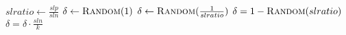 \begin{algorithm}[htbp]
\begin{multicols}{2}
\begin{algorithmic}[1]
		\State \Return{$ \delta $}
	\EndIf
	\\
	\State $ slratio \gets \frac{slp}{sln} $
		\State $ \delta \gets \Call{Random}{1} $
		\State $ \delta \gets \Call{Random}{\frac{1}{slratio}} $
	\Else
		\State $ \delta = 1 - \Call{Random}{slratio} $
	\EndIf
	\\
		\State $ \delta = \delta \cdot \frac{sln}{k} $
	\EndIf
	\\
	\State \Return{$ \delta $}
\EndFunction
\end{algorithmic}
\end{multicols}
\end{algorithm}
\restoregeometry

